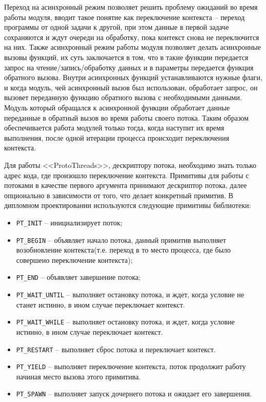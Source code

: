 Переход на асинхронный режим позволяет решить проблему ожиданий во время работы модуля, вводит такое понятие как переключение контекста -- переход программы
от одной задачи к другой, при этом данные в первой задаче сохраняются и ждут очереди на обработку, пока контекст снова не переключится на них. Также асинхронный
режим работы модуля позволяет делать асинхронные вызовы функций, их суть заключается в том, что в такие функции передается запрос на чтение/запись/обработку данных
и в параметры передается функция обратного вызова. Внутри асинхронных функций устанавливаются нужные флаги, и когда модуль, чей асинхронный вызов был использован,
обработает запрос, он вызовет переданную функцию обратного вызова с необходимыми данными. Модуль который обращался к асинхронной функции обработает данные переданные в обратный вызов
во время работы своего потока. Таким образом обеспечивается работа модулей только тогда, когда наступит их время выполнения, после одной итерации процесса происходит переключения контекста.

Для работы <<ProtoThreads>>, дескриптору потока, необходимо знать только адрес кода, где произошло переключение контекста. 
Примитивы для работы с потоками в качестве первого аргумента принимают дескриптор потока,
далее опционально в зависимости от того, что делает конкретный примитив.
В дипломном проектировании используются следующие примитивы библиотеки:

\begin{itemize}
    \item \lstinline{PT_INIT} -- инициализирует поток;
    \item \lstinline{PT_BEGIN} -- объявляет начало потока, данный примитив выполняет возобновление контекста(т.е. переход в то место процесса, где было совершено переключение контекста);
    \item \lstinline{PT_END} -- объявляет завершение потока;
    \item \lstinline{PT_WAIT_UNTIL} -- выполняет остановку потока, и ждет, когда условие не станет истинно, в ином случае переключает контекст.
    \item \lstinline{PT_WAIT_WHILE} -- выполняет остановку потока, и ждет, когда условие истинно, в ином случае переключает контекст.
    \item \lstinline{PT_RESTART} -- выполняет сброс потока и переключает контекст.
    \item \lstinline{PT_YIELD} -- выполняет переключение контекста, поток продолжит работу начиная место вызова этого примитива.
    \item \lstinline{PT_SPAWN} -- выполняет запуск дочернего потока и ожидает его завершения.
\end{itemize}

